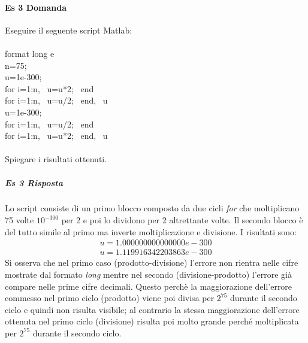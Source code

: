 \documentclass[a4paper]{report}
\begin{document}
\paragraph{Es 3 Domanda}
Eseguire il seguente script Matlab:\\
\\format long e\\n=75;\\u=1e-300;\\for i=1:n, \ u=u*2; \ end\\for i=1:n, \ u=u/2; \ end, \ u\\u=1e-300;\\for i=1:n, \ u=u/2; \ end\\for i=1:n, \ u=u*2; \ end, \ u\\\\Spiegare i risultati ottenuti.
\subparagraph{Es 3 Risposta}
Lo script consiste di un primo blocco composto da due cicli \emph{for} che moltiplicano 75 volte $10^{-300}$ per 2 e poi lo dividono per 2 altrettante volte. Il secondo blocco è del tutto simile al primo ma inverte moltiplicazione e divisione.
I risultati sono:
\[
\begin{aligned}
u = 1.000000000000000e-300\\
u = 1.119916342203863e-300
\end{aligned}
\]
Si osserva che nel primo caso (prodotto-divisione) l'errore non rientra nelle cifre mostrate dal formato \emph{long} mentre nel secondo (divisione-prodotto) l'errore già compare nelle prime cifre decimali.
Questo perchè la maggiorazione dell'errore commesso nel primo ciclo (prodotto) viene poi divisa per $2^{75}$ durante il secondo ciclo e quindi non risulta visibile; al contrario la stessa maggiorazione dell'errore ottenuta nel primo ciclo (divisione) risulta poi molto grande perché moltiplicata per $2^{75}$ durante il secondo ciclo.
\newpage
\end{document}
